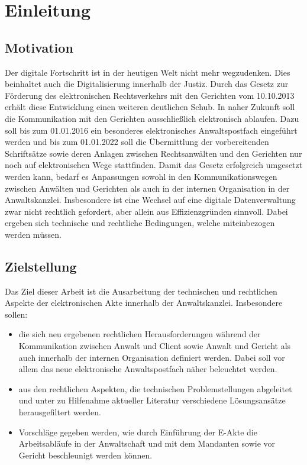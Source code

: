 \section{Einleitung}

\subsection{Motivation}
Der digitale Fortschritt ist in der heutigen Welt nicht mehr wegzudenken. Dies beinhaltet auch die Digitalisierung innerhalb der Justiz. Durch das Gesetz zur Förderung des elektronischen Rechtsverkehrs mit den Gerichten vom 10.10.2013 erhält diese Entwicklung einen weiteren deutlichen Schub. In naher Zukunft soll die Kommunikation mit den Gerichten ausschließlich elektronisch ablaufen. Dazu soll bis zum 01.01.2016 ein besonderes elektronisches Anwaltspostfach eingeführt werden und bis zum 01.01.2022 soll die Übermittlung der vorbereitenden Schriftsätze sowie deren Anlagen zwischen Rechtsanwälten und den Gerichten nur noch auf elektronischen Wege stattfinden. 
Damit das Gesetz erfolgreich umgesetzt werden kann, bedarf es Anpassungen sowohl in den Kommunikationswegen zwischen Anwälten und Gerichten als auch in der internen Organisation in der Anwaltskanzlei. Insbesondere ist eine Wechsel auf eine digitale Datenverwaltung zwar nicht rechtlich gefordert, aber allein aus Effizienzgründen sinnvoll. Dabei ergeben sich technische und rechtliche Bedingungen, welche miteinbezogen werden müssen.  

\subsection{Zielstellung}
Das Ziel dieser Arbeit ist die Ausarbeitung der technischen und rechtlichen Aspekte der elektronischen Akte innerhalb der Anwaltskanzlei. Insbesondere sollen:
\begin{itemize}
\item die sich neu ergebenen rechtlichen Herausforderungen während der Kommunikation zwischen Anwalt und Client sowie Anwalt und Gericht als auch innerhalb der internen Organisation definiert werden.  Dabei soll vor allem das neue elektronische Anwaltspostfach näher beleuchtet werden.
\item aus den rechtlichen Aspekten, die technischen Problemstellungen abgeleitet und unter zu Hilfenahme aktueller Literatur verschiedene Lösungsansätze herausgefiltert werden.
\item  Vorschläge gegeben werden, wie durch Einführung der E-Akte die Arbeitsabläufe in der Anwaltschaft und mit dem Mandanten sowie vor Gericht beschleunigt werden können.
\end{itemize} 

